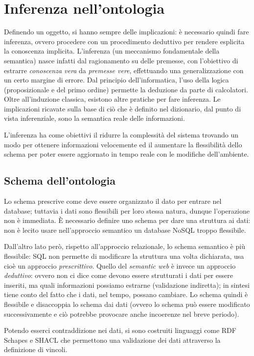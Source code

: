 \documentclass[11pt]{article}
\begin{document}
\section{Inferenza nell'ontologia}
Definendo un oggetto, si hanno sempre delle implicazioni: è necessario quindi fare inferenza, ovvero procedere con un procedimento deduttivo per rendere esplicita la conoscenza implicita. L'inferenza (un meccanismo fondamentale della semantica) nasce infatti dal ragionamento su delle premesse, con l'obiettivo di estrarre \textit{conoscenza vera} da \textit{premesse vere}, effettuando una generalizzazione con un certo margine di errore.
Dal principio dell'informatica, l'uso della logica (proposizionale e del primo ordine) permette la deduzione da parte di calcolatori.
Oltre all'induzione classica, esistono altre pratiche per fare inferenza.
Le implicazioni ricavate sulla base di ciò che è definito nel dizionario, dal punto di vista inferenziale, sono la semantica reale delle informazioni.

L'inferenza ha come obiettivi il ridurre la complessità del sistema trovando un modo per ottenere informazioni velocemente ed il aumentare la flessibilità dello schema per poter essere aggiornato in tempo reale con le modifiche dell'ambiente.

\subsection{Schema dell'ontologia}
Lo schema prescrive come deve essere organizzato il dato per entrare nel database; tuttavia i dati sono flessibili per loro stessa natura, dunque l'operazione non è immediata.
È necessario definire uno schema per dare una struttura ai dati: non è lecito usare nell'approccio semantico un database NoSQL troppo flessibile.

Dall'altro lato però, rispetto all'approccio relazionale, lo schema semantico è più flessibile: SQL non permette di modificare la struttura una volta dichiarata, usa cioè un approccio \textit{prescrittivo}.
Quello del \textit{semantic web} è invece un approccio \textit{deduttivo}: ovvero non ci dice come devono essere strutturati i dati per essere inseriti, ma quali informazioni possiamo estrarne (validazione indiretta); in sintesi tiene conto del fatto che i dati, nel tempo, possano cambiare.
Lo schema quindi è flessibile e disaccoppia lo schema dai dati (ovvero lo schema può essere modificato successivamente e ciò potrebbe provocare anche incoerenze nel breve periodo).

Potendo esserci contraddizione nei dati, si sono costruiti linguaggi come RDF Schapes e SHACL che permettono una validazione dei dati attraverso la definizione di vincoli.
\end{document}
